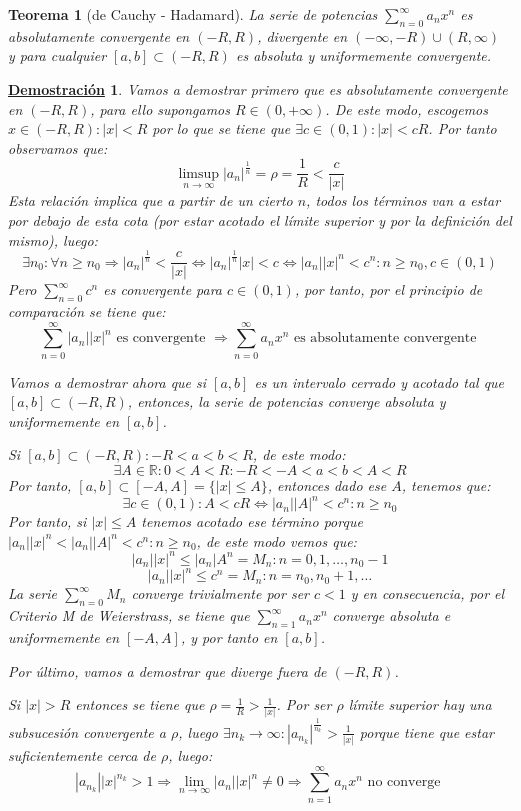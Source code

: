 \documentclass[10pt,a4paper,openright]{book}
\theoremstyle{break}
\newtheorem{theo}{Teorema}[chapter]
\newtheorem*{demo}{\underline{Demostración}}
\begin{document}
\begin{theo}[de Cauchy - Hadamard]
La serie de potencias $\sum_{n= 0}^{\infty} a_n x^n$ es absolutamente convergente en $(-R , R)$, divergente en $(-\infty, -R)\cup (R,\infty)$ y   para cualquier $[a,b]\subset (-R , R)$ es absoluta y uniformemente convergente.
\end{theo}
\begin{demo}
Vamos a demostrar primero que es absolutamente convergente en $(-R, R)$, para ello supongamos $R \in (0, +\infty)$. De este modo, escogemos $x \in (-R, R) : |x| < R$ por lo que se tiene que $\exists c \in (0,1) : |x| < cR$. Por tanto observamos que:
$$\limsup_{n\rightarrow\infty} |a_n|^{\frac{1}{n}} = \rho = \frac{1}{R} < \frac{c}{|x|}$$
Esta relación implica que a partir de un cierto $n$, todos los términos van a estar por debajo de esta cota (por estar acotado el límite superior y por la definición del mismo), luego:
$$\exists n_0 : \forall n \geq n_0 \Rightarrow |a_n|^{\frac{1}{n}} < \frac{c}{|x|} \Leftrightarrow  |a_n|^{\frac{1}{n}}  |x| < c \Leftrightarrow |a_n| |x|^n < c^n : n \geq n_0 , c \in (0,1)$$
Pero $\sum_{n = 0}^{\infty} c^n$ es convergente para $c \in (0,1)$, por tanto, por el principio de comparación se tiene que:
$$\sum_{n=0}^{\infty} |a_n||x|^n \mbox{ es convergente } \Rightarrow \sum_{n=0}^{\infty} a_n x^n \mbox{ es absolutamente convergente }$$

Vamos a demostrar ahora que si $[a,b]$ es un intervalo cerrado y acotado tal que $[a,b] \subset (-R , R)$, entonces, la serie de potencias converge absoluta y uniformemente en $[a,b]$.

Si $[a,b] \subset (-R , R) : - R < a < b < R$, de este modo:
$$\exists A \in \mathbb R: 0 < A < R : - R < - A < a < b < A < R $$
Por tanto, $[a,b] \subset [-A, A] = \{|x| \leq A\}$, entonces dado ese $A$, tenemos que:
$$\exists c \in (0,1) : A < cR \Leftrightarrow |a_n| |A|^n < c^n : n \geq n_0$$
Por tanto, si $|x| \leq A$ tenemos acotado ese término porque $|a_n| |x|^n  < |a_n| |A|^n  < c^n : n \geq n_0$, de este modo vemos que:
$$|a_n||x|^n \leq |a_n| A^n = M_n : n = 0,1, \ldots, n_0 - 1$$
$$|a_n||x|^n \leq c^n = M_n : n = n_0, n_0 + 1, \ldots$$
La serie $\sum_{n=0}^{\infty} M_n$ converge trivialmente por ser $c < 1$ y en consecuencia, por el Criterio M de Weierstrass, se tiene que $\sum_{n=1}^{\infty} a_n x^n$ converge absoluta e uniformemente en $[-A, A]$, y por tanto en $[a,b]$.

Por último, vamos a demostrar que diverge fuera de $(-R,R)$.

Si $|x| > R$ entonces se tiene que $\rho = \frac{1}{R} > \frac{1}{|x|}$. Por ser $\rho$ límite superior hay una subsucesión convergente a $\rho$, luego $\exists n_k \to \infty : |a_{n_k}|^\frac{1}{n_k} > \frac{1}{|x|}$ porque tiene que estar suficientemente cerca de $\rho$, luego:
$$|a_{n_k}| |x|^{n_k} > 1\Rightarrow \lim_{n \to \infty} |a_n||x|^n \neq 0 \Rightarrow \sum_{n=1}^{\infty} a_n x^n \mbox{ no converge }$$
\end{demo}
\end{document}
